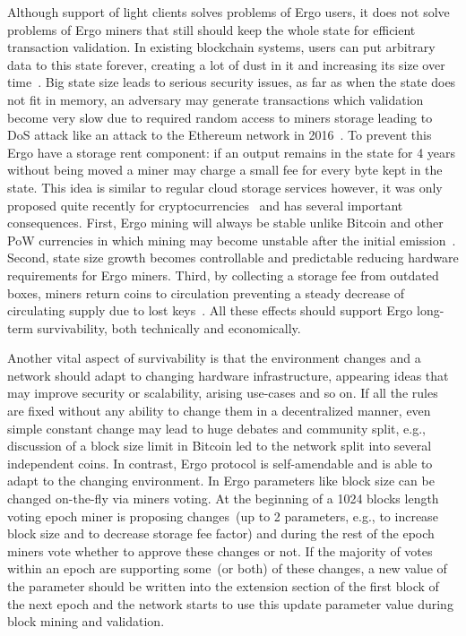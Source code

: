 Although support of light clients solves problems of Ergo users, it does not solve problems
of Ergo miners that still should keep the whole state for efficient
transaction validation.
In existing blockchain systems, users can put arbitrary data to this state forever,
creating a lot of dust in it and increasing its size over time~\cite{perez2019another}.
Big state size leads to serious security issues, as far as when the state does not fit in memory,
an adversary may generate transactions which validation become very slow due to required random
access to miners storage
leading to DoS attack like an attack to the Ethereum network in 2016~\cite{??}.
To prevent this Ergo have a storage rent component: if an
output remains in the state for 4 years without being moved a miner may charge a small fee for every
byte kept in the state.
This idea is similar to regular cloud storage services however, it was only proposed quite recently for
cryptocurrencies~\cite{chepurnoy2017space} and has several important consequences.
First, Ergo mining will always be stable unlike Bitcoin and other PoW currencies
in which mining may become unstable after the
initial emission~\cite{carlsten2016instability}.
Second, state size growth becomes controllable and predictable reducing hardware requirements for Ergo miners.
Third, by collecting a storage fee from outdated boxes, miners return coins to circulation preventing a steady decrease
of circulating supply due to lost keys~\cite{wsj2018}.
All these effects should support Ergo long-term survivability, both technically and economically.

Another vital aspect of survivability is that the environment changes and a network should
adapt to changing hardware infrastructure, appearing ideas that may improve security or
scalability, arising use-cases and so on.
If all the rules are fixed without any ability to change them in a decentralized manner, even
simple constant change may lead to huge debates and community split, e.g., discussion of a block
size limit in Bitcoin led to the network split into several independent coins.
In contrast, Ergo protocol is self-amendable and is able to adapt to the changing environment.
In Ergo parameters like block size can be changed on-the-fly via miners voting.
At the beginning of a 1024 blocks length voting epoch miner is proposing changes~(up to 2 parameters,
e.g., to increase block size and to decrease storage fee factor) and during the rest of the epoch miners
vote whether to approve these changes or not.
If the majority of votes within an epoch are supporting some~(or both) of these changes, a new value of
the parameter should be written into the extension section of the first block of the next epoch and
the network starts to use this update parameter value during block mining and validation.

